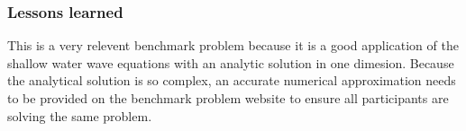 

\subsubsection{Lessons learned}

This is a very relevent benchmark problem because it is a good
application of the shallow water wave equations with an analytic solution
in one dimesion. Because the analytical solution is so complex, an accurate
numerical approximation needs to be provided on the benchmark problem
website to ensure all participants are solving the same problem.
